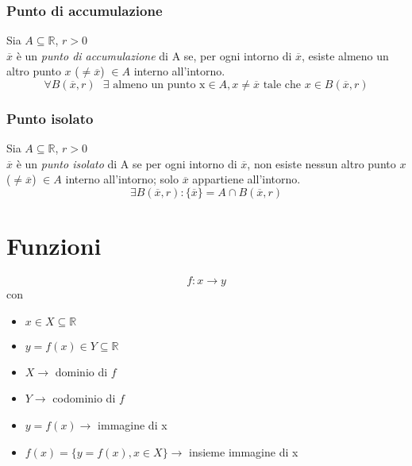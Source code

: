 \documentclass[a4paper,12pt, oneside]{book}
\begin{document}
\subsection{Punto di accumulazione}
\begin{definizione}
Sia $A \subseteq \mathbb{R}$, $r>0$\\
$\overline{x}$ è un \emph{punto di accumulazione} di A se, per ogni intorno di $\overline{x}$, esiste almeno un altro punto $x$ ($ \neq \overline{x}$) $\in A$ interno all'intorno.
\begin{equation}
\forall B(\overline{x},r) \mbox{  } \exists \mbox{ almeno un punto x} \in A, x \neq \overline{x} \mbox{ tale che } x \in B(\overline{x},r)
\end{equation}
\end{definizione}
\subsection{Punto isolato}
\begin{definizione}
Sia $A \subseteq \mathbb{R}$, $r>0$\\
$\overline{x}$ è un \emph{punto isolato} di A se per ogni intorno di $\overline{x}$, non esiste nessun altro punto $x$ ($ \neq \overline{x}$) $\in A$ interno all'intorno; solo $\overline{x}$ appartiene all'intorno.
\begin{equation}
\exists B(\overline{x}, r) \colon \{\overline{x}\} = A \cap B(\overline{x}, r)
\end{equation}
\end{definizione}
\chapter{Funzioni}
\begin{equation}
	f: x \rightarrow y
\end{equation}
con 
\begin{itemize}
	\item $x \in X \subseteq \mathbb{R}$
	\item $y = f(x) \in Y \subseteq \mathbb{R}$
\end{itemize}
\begin{shaded}
\begin{itemize}
	\item $X \rightarrow $ dominio di $f$
	\item $Y \rightarrow $ codominio di $f$
	\item $y = f(x) \rightarrow $ immagine di x
	\item $f(x) = \{ y = f(x), x \in X \} \rightarrow $ insieme immagine di x
\end{itemize}
\end{shaded}
\end{document}
